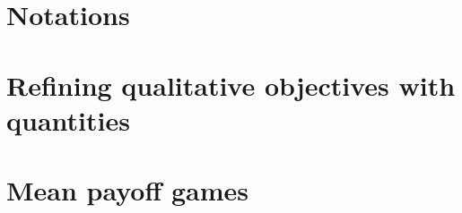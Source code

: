 
\section*{Notations}
\label{4-sec:notations}


\section{Refining qualitative objectives with quantities}
\label{4-sec:qualitative}


\section{Mean payoff games}
\label{4-sec:mean_payoff}


